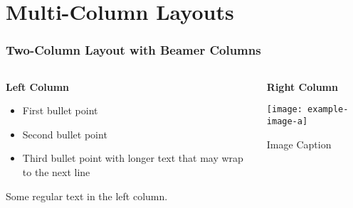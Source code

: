 \documentclass[aspectratio=169,professionalfonts]{beamer}
\begin{document}
\section{Multi-Column Layouts}

\begin{frame}
    \frametitle{Two-Column Layout with Beamer Columns}
    
    \begin{columns}[T]
        \begin{column}{0.48\textwidth}
            \textbf{Left Column}
            \begin{itemize}
                \item First bullet point
                \item Second bullet point
                \item Third bullet point with longer text that may wrap to the next line
            \end{itemize}
            
            Some regular text in the left column.
        \end{column}
        
        \begin{column}{0.48\textwidth}
            \textbf{Right Column}
            
            \texttt{[image: example-image-a]}
            \centerline{\small Image Caption}
        \end{column}
    \end{columns}
\end{frame}
\end{document}

